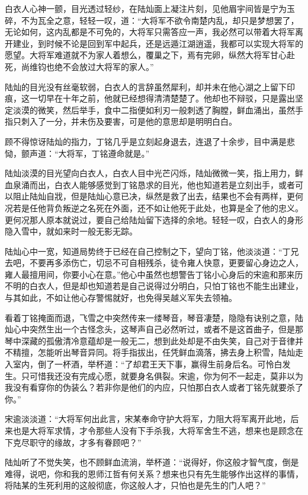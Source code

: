 白衣人心神一颤，目光透过轻纱，在陆灿面上凝注片刻，见他眉宇间皆是宁为玉碎，不为瓦全之意，轻轻一叹，道：“大将军不欲令南楚内乱，却只是梦想罢了，无论如何，这内乱都是不可免的，大将军只需答应一声，我必然可以带着大将军离开建业，到时候不论是回到军中起兵，还是远遁江湖逍遥，我都可以实现大将军的愿望。大将军难道就不为家人着想么，覆巢之下，焉有完卵，纵然大将军甘心赴死，尚维钧也绝不会放过大将军的家人。”

陆灿的目光没有丝毫软弱，白衣人的言辞虽然犀利，却并未在他心湖之上留下印痕，这一切早在十年之前，他就已经想得清清楚楚了。他却也不辩驳，只是露出坚定淡漠的微笑，然后举手，食中二指便如利刃一般刺透了胸膛，鲜血涌出，虽然手指只刺入了一分，并未伤及要害，可是他的意思却是明明白白。

顾不得惊讶陆灿的指力，丁铭几乎是立刻起身退去，连退了十余步，目中满是悲恸，颤声道：“大将军，丁铭遵命就是。”

陆灿淡漠的目光望向白衣人，白衣人目中光芒闪烁，陆灿微微一笑，指上用力，鲜血泉涌而出，白衣人能够感觉到丁铭恳求的目光，他也知道若是立刻出手，或者可以阻止陆灿自戕，但是陆灿心意已决，纵然是救了出去，结果也不会有两样，更何况若是任他背负叛逆之名死在外面，还不如让他死于此处，也算是全了他的忠义。更何况那人原本就说过，要自己给陆灿留下选择的余地。轻轻一叹，白衣人的身形隐入雪中，就如来时一般无影无踪。

陆灿心中一宽，知道局势终于已经在自己控制之下，望向丁铭，他淡淡道：“丁兄去吧，不要再多添伤亡，切忌不可自相残杀，徒令雍人快意，更要留心身边之人，雍人最擅用间，你要小心在意。”他心中虽然也想警告丁铭小心身后的宋逾和那来历不明的白衣人，但是却也知道若是自己说得过分明白，只怕丁铭也不能生出建业，与其如此，不如让他心存警惕就好，也免得吴越义军失去领袖。

看着丁铭掩面而退，飞雪之中突然传来一缕琴音，琴音凄楚，隐隐有诀别之意，陆灿心中突然生出一个古怪念头，这琴声自己必然听过，或者不是这首曲子，但是那琴中深藏的孤傲清冷意蕴却是一般无二，想到此处却是不由失笑，自己对于音律并不精擅，怎能听出琴音异同。将手指拔出，任凭鲜血滴落，拂去身上积雪，陆灿走入室内，倒了一杯酒，举杯道：“了却君王天下事，赢得生前身后名。可怜白发生。只可惜我还没有完成心愿，就要身名俱裂。宋逾，你为何不一起走，莫非以为我没有看穿你的伪装么？若非你是他们的内应，只怕那白衣人或者丁铭先就要杀了你。”

宋逾淡淡道：“大将军何出此言，宋某奉命守护大将军，力阻大将军离开此地，后来也是大将军求情，才令那些人没有下手杀我，大将军舍生不逃，想来也是顾念在下克尽职守的缘故，才多有眷顾吧？”

陆灿听了不觉失笑，也不顾鲜血流淌，举杯道：“说得好，你这般才智气度，倒是难得，说吧，你和我的恩师江哲有何关系？想来也只有先生能够作出这样的事情，将陆某的生死利用的这般彻底，你这般人才，只怕也是先生的门人吧？”

